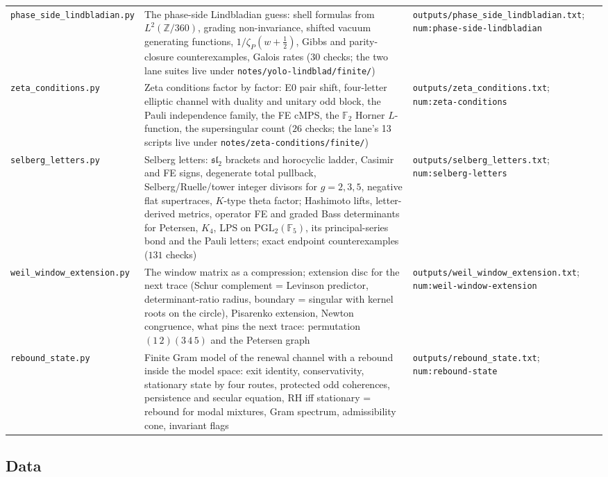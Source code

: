 \begin{center}
\begin{tabular}{p{4.2cm}p{6.4cm}p{4.6cm}}
\texttt{phase\_side\_lindbladian.py} & The phase-side Lindbladian guess: shell formulas from $L^2(\mathbb Z/360)$, grading non-invariance, shifted vacuum generating functions, $1/\zeta_P(w+\tfrac12)$, Gibbs and parity-closure counterexamples, Galois rates ($30$ checks; the two lane suites live under \texttt{notes/yolo-lindblad/finite/}) & \texttt{outputs/phase\_side\_lindbladian.txt}; \texttt{num:phase-side-lindbladian} \\
\texttt{zeta\_conditions.py} & Zeta conditions factor by factor: E0 pair shift, four-letter elliptic channel with duality and unitary odd block, the Pauli independence family, the FE cMPS, the $\mathbb F_2$ Horner $L$-function, the supersingular count ($26$ checks; the lane's 13 scripts live under \texttt{notes/zeta-conditions/finite/}) & \texttt{outputs/zeta\_conditions.txt}; \texttt{num:zeta-conditions} \\
\texttt{selberg\_letters.py} & Selberg letters: $\mathfrak{sl}_2$ brackets and horocyclic ladder, Casimir and FE signs, degenerate total pullback, Selberg/Ruelle/tower integer divisors for $g = 2,3,5$, negative flat supertraces, $K$-type theta factor; Hashimoto lifts, letter-derived metrics, operator FE and graded Bass determinants for Petersen, $K_4$, LPS on $\mathrm{PGL}_2(\mathbb F_5)$, its principal-series bond and the Pauli letters; exact endpoint counterexamples ($131$ checks) & \texttt{outputs/selberg\_letters.txt}; \texttt{num:selberg-letters} \\
\texttt{weil\_window\_extension.py} & The window matrix as a compression; extension disc for the next trace (Schur complement = Levinson predictor, determinant-ratio radius, boundary = singular with kernel roots on the circle), Pisarenko extension, Newton congruence, what pins the next trace: permutation $(1\,2)(3\,4\,5)$ and the Petersen graph & \texttt{outputs/weil\_window\_extension.txt}; \texttt{num:weil-window-extension} \\
\texttt{rebound\_state.py} & Finite Gram model of the renewal channel with a rebound inside the model space: exit identity, conservativity, stationary state by four routes, protected odd coherences, persistence and secular equation, RH iff stationary = rebound for modal mixtures, Gram spectrum, admissibility cone, invariant flags & \texttt{outputs/rebound\_state.txt}; \texttt{num:rebound-state} \\
\bottomrule
\end{tabular}
\end{center}

\subsection*{Data}

